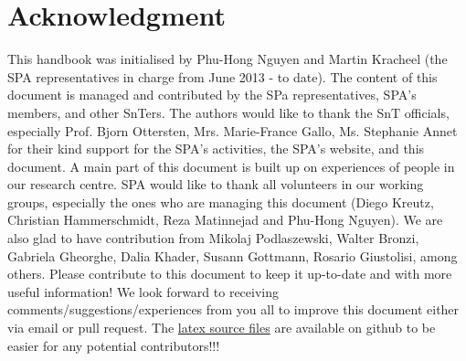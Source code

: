 \section*{Acknowledgment}
This handbook was initialised by Phu-Hong Nguyen and Martin Kracheel (the SPA representatives in charge from June 2013 - to date). The content of this document is managed and contributed by the SPa representatives, SPA's members, and other SnTers. The authors would like to thank the SnT officials, especially Prof. Bjorn Ottersten, Mrs. Marie-France Gallo, Ms. Stephanie Annet for their kind support for the SPA's activities, the SPA's website, and this document. 
A main part of this document is built up on experiences of people in our research centre. 
SPA would like to thank all volunteers in our working groups, especially the ones who are managing this document (Diego Kreutz, Christian Hammerschmidt, Reza Matinnejad and Phu-Hong Nguyen). 
We are also glad to have contribution from Mikolaj Podlaszewski, Walter Bronzi, Gabriela Gheorghe, Dalia Khader, Susann Gottmann, Rosario Giustolisi, among others. 
Please contribute to this document to keep it up-to-date and with more useful information! 
We look forward to receiving comments/suggestions/experiences from you all to improve this document either via email or pull request. 
The \href{https://github.com/SPAlux/handbook}{latex source files} are available on github to be easier for any potential contributors!!!
